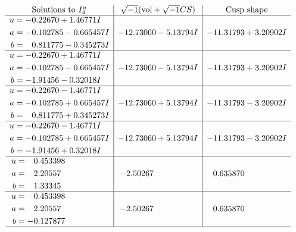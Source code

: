 \documentclass[1p]{elsarticle_modified}
\theoremstyle{definition}
\newcommand{\I}{\sqrt{-1}}
\begin{document}
$$\begin{array}{c|c|c}  
\text{Solutions to }I^u_{4}& \I (\text{vol} + \sqrt{-1}CS) & \text{Cusp shape}\\
 \hline 
\begin{aligned}
u &= -0.22670 + 1.46771 I \\
a &= -0.102785 - 0.665457 I \\
b &= \phantom{-}0.811775 - 0.345273 I\end{aligned}
 & -12.73060 - 5.13794 I & -11.31793 + 3.20902 I \\ \hline\begin{aligned}
u &= -0.22670 + 1.46771 I \\
a &= -0.102785 - 0.665457 I \\
b &= -1.91456 - 0.32018 I\end{aligned}
 & -12.73060 - 5.13794 I & -11.31793 + 3.20902 I \\ \hline\begin{aligned}
u &= -0.22670 - 1.46771 I \\
a &= -0.102785 + 0.665457 I \\
b &= \phantom{-}0.811775 + 0.345273 I\end{aligned}
 & -12.73060 + 5.13794 I & -11.31793 - 3.20902 I \\ \hline\begin{aligned}
u &= -0.22670 - 1.46771 I \\
a &= -0.102785 + 0.665457 I \\
b &= -1.91456 + 0.32018 I\end{aligned}
 & -12.73060 + 5.13794 I & -11.31793 - 3.20902 I \\ \hline\begin{aligned}
u &= \phantom{-}0.453398\phantom{ +0.000000I} \\
a &= \phantom{-}2.20557\phantom{ +0.000000I} \\
b &= \phantom{-}1.33345\phantom{ +0.000000I}\end{aligned}
 & -2.50267\phantom{ +0.000000I} & \phantom{-}0.635870\phantom{ +0.000000I} \\ \hline\begin{aligned}
u &= \phantom{-}0.453398\phantom{ +0.000000I} \\
a &= \phantom{-}2.20557\phantom{ +0.000000I} \\
b &= -0.127877\phantom{ +0.000000I}\end{aligned}
 & -2.50267\phantom{ +0.000000I} & \phantom{-}0.635870\phantom{ +0.000000I}\\
 \hline 
 \end{array}$$\newpage\newpage\renewcommand{\arraystretch}{1}
\end{document}
